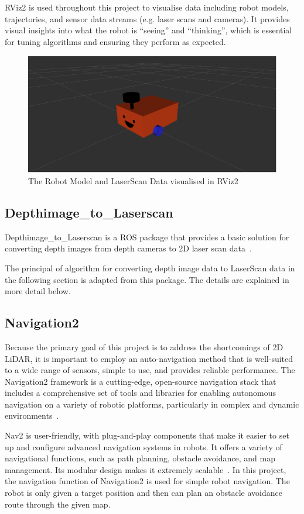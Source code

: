 RViz2 is used throughout this project to visualise data including robot models, 
trajectories, and sensor data streams (e.g. laser scans and cameras). 
It provides visual insights into what the robot is ``seeing'' and ``thinking'', 
which is essential for tuning algorithms and ensuring they perform as expected.
\begin{figure}[H]
    \centering
    \includegraphics[width=0.8\linewidth]{figs/robot.png}
    \caption{The Robot Model and LaserScan Data visualised in RViz2}
\end{figure}
\subsection{Depthimage\_to\_Laserscan}
Depthimage\_to\_Laserscan is a ROS package that provides a basic solution for converting depth images from depth cameras to 2D laser scan data~\cite{rosdepthimage}. 

The principal of algorithm for converting depth image data to LaserScan data in the following section is adapted from this package. 
The details are explained in more detail below.

\subsection{Navigation2}
Because the primary goal of this project is to address the shortcomings of 2D LiDAR, 
it is important to employ an auto-navigation method that is well-suited to a wide range of sensors, 
simple to use, and provides reliable performance.
The Navigation2 framework is a cutting-edge, 
open-source navigation stack that includes a comprehensive set of tools and libraries 
for enabling autonomous navigation on a variety of robotic platforms, particularly in complex and dynamic environments~\cite{nav2}. 

Nav2 is user-friendly, with plug-and-play components 
that make it easier to set up and configure advanced navigation systems in robots. 
It offers a variety of navigational functions, 
such as path planning, obstacle avoidance, and map management. Its modular design makes it extremely scalable~\cite{nav2doc}. 
In this project, the navigation function of Navigation2 is used for simple robot navigation. 
The robot is only given a target position and then can plan an obstacle avoidance route through the given map.
